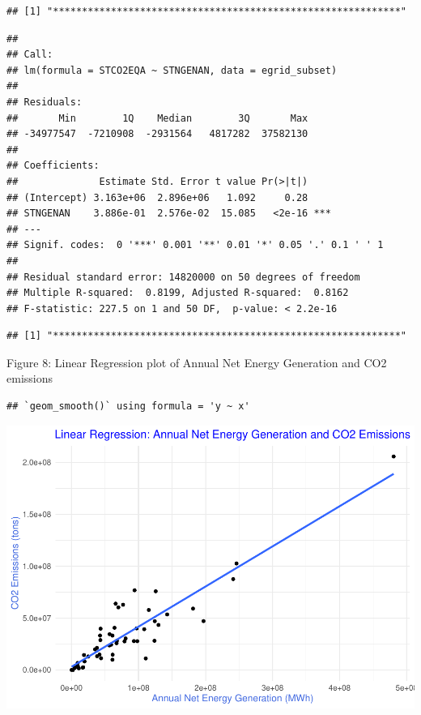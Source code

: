 \documentclass[
]{article}
\begin{document}
\begin{verbatim}
## [1] "************************************************************"
\end{verbatim}

\begin{verbatim}
## 
## Call:
## lm(formula = STCO2EQA ~ STNGENAN, data = egrid_subset)
## 
## Residuals:
##       Min        1Q    Median        3Q       Max 
## -34977547  -7210908  -2931564   4817282  37582130 
## 
## Coefficients:
##              Estimate Std. Error t value Pr(>|t|)    
## (Intercept) 3.163e+06  2.896e+06   1.092     0.28    
## STNGENAN    3.886e-01  2.576e-02  15.085   <2e-16 ***
## ---
## Signif. codes:  0 '***' 0.001 '**' 0.01 '*' 0.05 '.' 0.1 ' ' 1
## 
## Residual standard error: 14820000 on 50 degrees of freedom
## Multiple R-squared:  0.8199, Adjusted R-squared:  0.8162 
## F-statistic: 227.5 on 1 and 50 DF,  p-value: < 2.2e-16
\end{verbatim}

\begin{verbatim}
## [1] "************************************************************"
\end{verbatim}

Figure 8: Linear Regression plot of Annual Net Energy Generation and CO2
emissions

\begin{verbatim}
## `geom_smooth()` using formula = 'y ~ x'
\end{verbatim}

\begin{center}\includegraphics{EDA_Project_Mutha_Kry_Ghosh_VS_files/figure-latex/Q5_CO2-1} \end{center}
\end{document}
